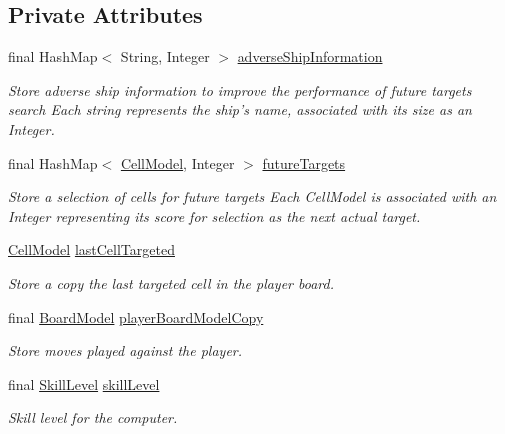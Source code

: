 \subsection*{Private Attributes}
\begin{DoxyCompactItemize}
\item 
final Hash\-Map$<$ String, Integer $>$ \hyperlink{classbattleship2D_1_1ui_1_1BoardUIComputer_adf7a02abc86da93e185ff514c12e9265}{adverse\-Ship\-Information}
\begin{DoxyCompactList}\small\item\em Store adverse ship information to improve the performance of future targets search Each string represents the ship's name, associated with its size as an Integer. \end{DoxyCompactList}\item 
final Hash\-Map$<$ \hyperlink{classbattleship2D_1_1model_1_1CellModel}{Cell\-Model}, Integer $>$ \hyperlink{classbattleship2D_1_1ui_1_1BoardUIComputer_a1290864469f2ab3ba675119d1ac709f4}{future\-Targets}
\begin{DoxyCompactList}\small\item\em Store a selection of cells for future targets Each Cell\-Model is associated with an Integer representing its score for selection as the next actual target. \end{DoxyCompactList}\item 
\hyperlink{classbattleship2D_1_1model_1_1CellModel}{Cell\-Model} \hyperlink{classbattleship2D_1_1ui_1_1BoardUIComputer_a0d4adb0bce02dfe3629b361edbb58ce0}{last\-Cell\-Targeted}
\begin{DoxyCompactList}\small\item\em Store a copy the last targeted cell in the player board. \end{DoxyCompactList}\item 
final \hyperlink{classbattleship2D_1_1model_1_1BoardModel}{Board\-Model} \hyperlink{classbattleship2D_1_1ui_1_1BoardUIComputer_a732fb169b5de8459716765e2196e0a13}{player\-Board\-Model\-Copy}
\begin{DoxyCompactList}\small\item\em Store moves played against the player. \end{DoxyCompactList}\item 
final \hyperlink{enumbattleship2D_1_1model_1_1SkillLevel}{Skill\-Level} \hyperlink{classbattleship2D_1_1ui_1_1BoardUIComputer_a1c8d0fc4e6fd8ae9402dc45bee0fde2b}{skill\-Level}
\begin{DoxyCompactList}\small\item\em Skill level for the computer. \end{DoxyCompactList}\end{DoxyCompactItemize}
